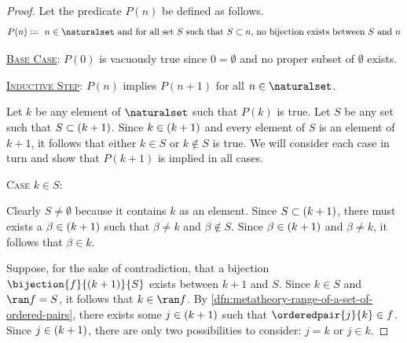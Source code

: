 \begin{proof}
    Let the predicate \( P(n) \) be defined as follows.
    \begin{equation*}
        P(n) \coloneq \text{ \( n \in \naturalset \) and for all set \( S \) such that \( S \subset n \), no bijection exists between \( S \) and \( n \)}
    \end{equation*}

    \noindent
    \underline{\scshape Base Case}: \( P(0) \) is vacuously true since \( 0 = \emptyset \) and no proper subset of \( \emptyset \) exists.

    \vspace{0.3cm}
    \noindent
    \underline{\scshape Inductive Step}: \( P(n) \) implies \( P(n + 1) \) for all \( n \in \naturalset \).

    \vspace{0.3cm}
    \noindent
    Let \( k \) be any element of \( \naturalset \) such that \( P(k) \) is true.
    Let \( S \) be any set such that \( S \subset \mleft( k + 1 \mright) \).
    Since \( k \in \mleft( k + 1 \mright) \) and every element of \( S \) is an element of \( k + 1 \), it follows that either \( k \in S \) or \( k \notin S \) is true.
    We will consider each case in turn and show that \( P(k + 1) \) is implied in all cases.

    \vspace{0.3cm}
    \noindent
    {\scshape Case} \( k \in S \):

    \vspace{0.1cm}
    \noindent
    Clearly \( S \neq \emptyset \) because it contains \( k \) as an element.
    Since \( S \subset \mleft( k + 1 \mright) \), there must exists a \( \beta \in \mleft( k + 1 \mright) \) such that \( \beta \neq k \) and \( \beta \notin S \).
    Since \( \beta \in \mleft( k + 1 \mright) \) and \( \beta \neq k \), it follows that \( \beta \in k \).

    \vspace{0.3cm}
    \noindent
    Suppose, for the sake of contradiction, that a bijection \( \bijection{f}{\mleft( k + 1 \mright)}{S} \) exists between \( k + 1 \) and \( S \).
    Since \( k \in S \) and \( \ran f = S \), it follows that \( k \in \ran f \).
    By \cref{dfn:metatheory-range-of-a-set-of-ordered-pairs}, there exists some \( j \in \mleft( k + 1 \mright) \) such that \( \orderedpair{j}{k} \in f \).
    Since \( j \in \mleft( k + 1 \mright) \), there are only two possibilities to consider: \( j = k \) or \( j \in k \).


\end{proof}
